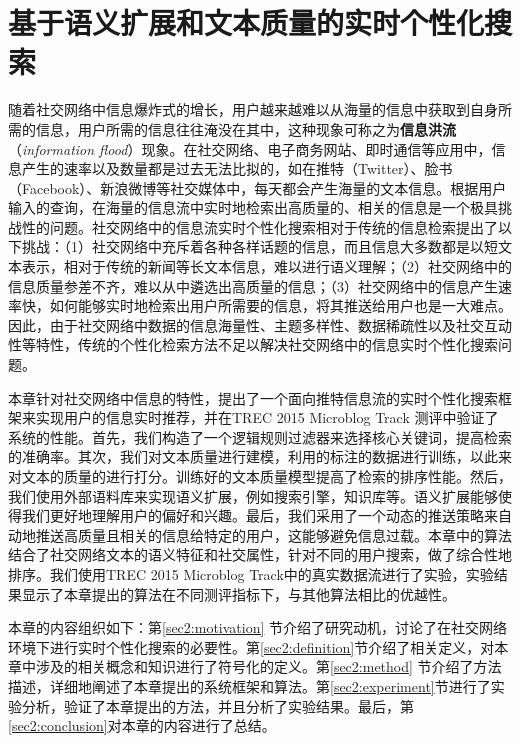\chapter{基于语义扩展和文本质量的实时个性化搜索}
\label{chap2:main}
随着社交网络中信息爆炸式的增长，用户越来越难以从海量的信息中获取到自身所需的信息，用户所需的信息往往淹没在其中，这种现象可称之为\textbf{信息洪流}（\textit{information flood}）现象。在社交网络、电子商务网站、即时通信等应用中，信息产生的速率以及数量都是过去无法比拟的，如在推特（Twitter）、脸书（Facebook）、新浪微博等社交媒体中，每天都会产生海量的文本信息。根据用户输入的查询，在海量的信息流中实时地检索出高质量的、相关的信息是一个极具挑战性的问题。社交网络中的信息流实时个性化搜索相对于传统的信息检索提出了以下挑战：（1）社交网络中充斥着各种各样话题的信息，而且信息大多数都是以短文本表示，相对于传统的新闻等长文本信息，难以进行语义理解；（2）社交网络中的信息质量参差不齐，难以从中遴选出高质量的信息；（3）社交网络中的信息产生速率快，如何能够实时地检索出用户所需要的信息，将其推送给用户也是一大难点。因此，由于社交网络中数据的信息海量性、主题多样性、数据稀疏性以及社交互动性等特性，传统的个性化检索方法不足以解决社交网络中的信息实时个性化搜索问题。

本章针对社交网络中信息的特性，提出了一个面向推特信息流的实时个性化搜索框架来实现用户的信息实时推荐，并在TREC 2015 Microblog Track 测评中验证了系统的性能。首先，我们构造了一个逻辑规则过滤器来选择核心关键词，提高检索的准确率。其次，我们对文本质量进行建模，利用的标注的数据进行训练，以此来对文本的质量的进行打分。训练好的文本质量模型提高了检索的排序性能。然后，我们使用外部语料库来实现语义扩展，例如搜索引擎，知识库等。语义扩展能够使得我们更好地理解用户的偏好和兴趣。最后，我们采用了一个动态的推送策略来自动地推送高质量且相关的信息给特定的用户，这能够避免信息过载。本章中的算法结合了社交网络文本的语义特征和社交属性，针对不同的用户搜索，做了综合性地排序。我们使用TREC 2015 Microblog Track中的真实数据流进行了实验，实验结果显示了本章提出的算法在不同测评指标下，与其他算法相比的优越性。

本章的内容组织如下：第\ref{sec2:motivation} 节介绍了研究动机，讨论了在社交网络环境下进行实时个性化搜索的必要性。第\ref{sec2:definition}节介绍了相关定义，对本章中涉及的相关概念和知识进行了符号化的定义。第\ref{sec2:method} 节介绍了方法描述，详细地阐述了本章提出的系统框架和算法。第\ref{sec2:experiment}节进行了实验分析，验证了本章提出的方法，并且分析了实验结果。最后，第\ref{sec2:conclusion}对本章的内容进行了总结。

